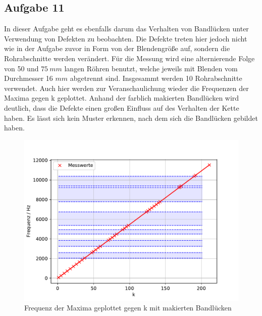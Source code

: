 \subsection{Aufgabe 11}
In dieser Aufgabe geht es ebenfalls darum das Verhalten von Bandlücken unter Verwendung von Defekten zu beobachten.
Die Defekte treten hier jedoch nicht wie in der Aufgabe zuvor in Form von der Blendengröße auf, sondern die Rohrabschnitte werden verändert.
Für die Messung wird eine alternierende Folge von 50 und $\SI{75}{mm}$ langen Röhren benutzt, welche jeweils mit Blenden vom Durchmesser 16 $\si{mm}$ abgetrennt sind.
Insgesammt werden 10 Rohrabschnitte verwendet.
Auch hier werden zur Veranschaulichung wieder die Frequenzen der Maxima gegen k geplottet.
Anhand der farblich makierten Bandlücken wird deutlich, dass die Defekte einen großen Einfluss auf des Verhalten der Kette haben.
Es lässt sich kein Muster erkennen, nach dem sich die Bandlücken gebildet haben.
\begin{figure}[h!]
  \centering
  \includegraphics[width=1\textwidth]{A112.pdf}
  \caption{Frequenz der Maxima geplottet gegen k mit makierten Bandlücken}
  \label{fig.Aufgabe111}
\end{figure}
\FloatBarrier

